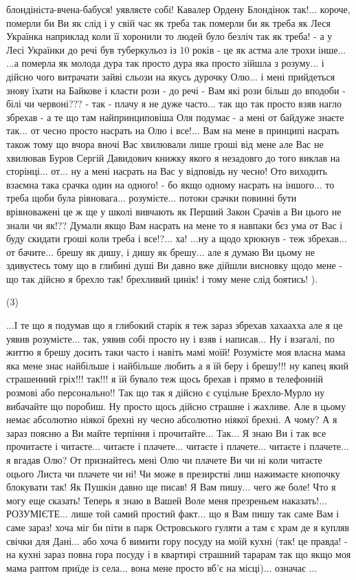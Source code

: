 блондініста-вчена-бабуся! уявляєте собі!  Кавалер Ордену Блондінок так!...
короче, померли би Ви як слід і у свій час як треба так померли би як треба як
Леся Українка наприклад коли її хоронили то людей було безліч так як треба! - а
у Лесі Українки до речі був туберкульоз із 10 років - це як астма але трохи
інше...  ...а померла як молода дура так просто дура яка просто зійшла з
розуму... і дійсно чого витрачати зайві сльози на якусь дурочку Олю... і мені
прийдеться знову їхати на Байкове і класти рози - до речі - Вам які рози більш
до вподоби - білі чи червоні??? - так - плачу я не дуже часто... так що так
просто взяв нагло збрехав - а те що там найпринциповіша Оля подумає - а мені от
байдуже знаєте так... от чесно просто насрать на Олю і все!... Вам на мене в
принципі насрать також тому що вчора вночі Вас хвилювали лише гроші від мене
але Вас не хвилював Буров Сергій Давидович книжку якого я незадовго до того
виклав на сторінці... от... ну а мені насрать на Вас у відповідь ну чесно! Ото
виходить взаємна така срачка один на одного! - бо якщо одному насрать на
іншого... то треба щоби була рівновага... розумієте...  потоки срачки повинні
бути врівноважені це ж ще у школі вивчають як Перший Закон Срачів а Ви цього не
знали чи як!?? Думали якщо Вам насрать на мене то я навпаки бєз ума от Вас і
буду скидати гроші коли треба і все!?... ха!  ...ну а щодо хрюкнув - теж
збрехав... от бачите... брешу як дишу, і дишу як брешу... але я думаю Ви цьому
не здивуєтесь тому що в глибині душі Ви давно вже дійшли висновку щодо мене -
що так дійсно я брехло так! брехливий цинік! і тому мене слід боятись! ).  

(3)

...І те що я подумав що я глибокий старік я теж зараз збрехав хахаахха але я це
уявив розумієте... так, уявив собі просто ну і взяв і написав... Ну і взагалі,
по життю я брешу досить таки часто і навіть мамі моїй!  Розумієте моя власна
мама яка мене знає найбільше і найбільше любить а я їй беру і брешу!!! ну капец
який страшенний гріх!!! так!!!  я їй бувало теж щось брехав і прямо в
телефонній розмові або персонально!!  Так що так я дійсно є суцільне
Брехло-Мурло ну вибачайте що поробиш. Ну просто щось дійсно страшне і жахливе.
Але в цьому немає абсолютно ніякої брехні ну чесно абсолютно ніякої брехні. А
чому? А я зараз поясню а Ви майте терпіння і прочитайте... Так... Я знаю Ви і
так все прочитаєте і читаєте...  читаєте і плачете... читаєте і плачете...
читаєте і плачете... я вгадав Олю? От признайтесь мені Олю чи плачете Ви чи ні
коли читаєте оцього Листа чи плачете чи ні! Чи може в презирстві лиш нажимаєте
кнопочку блокувати так!  Як Пушкін давно ще писав! Я Вам пишу... чего же боле!
Что я могу еще сказать! Теперь я знаю в Вашей Воле меня презреньем наказать!...
РОЗУМІЄТЕ... лише той самий простий факт... що я Вам пишу так саме Вам і саме
зараз! хоча міг би піти в парк Островського гуляти а там є храм де я купляв
свічки для Дані...  або хоча б вимити гору посуду на моїй кухні (так! це
правда! - на кухні зараз повна гора посуду і в квартирі страшний тарарам так що
якщо моя мама раптом приїде із села... вона мене просто вб'є на місці)...
означає ... 

